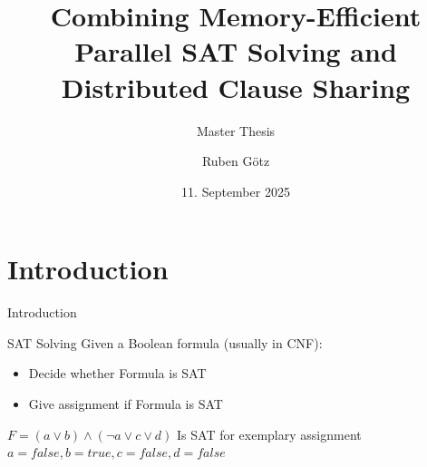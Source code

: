 \documentclass[]{sdqbeamer}
\title{Combining Memory-Efficient Parallel SAT Solving and Distributed Clause Sharing}
\subtitle{Master Thesis}
\author{Ruben Götz}
\date[11.\,9.\,2025]{11. September 2025}
\begin{document}
\begin{frame}[title white vertical, picture=images/palladio_bauplan]
	\titlepage
\end{frame}


\section{Introduction}
\begin{frame}{Introduction}
    \begin{block}{SAT Solving}
        Given a Boolean formula (usually in CNF):
        \begin{itemize}
            \item Decide whether Formula is SAT
            \item Give assignment if Formula is SAT
        \end{itemize}
    \end{block}

    \begin{exampleblock}{$F = (a \lor b) \land (\lnot a \lor c \lor d)$}
        Is SAT for exemplary assignment $a = false, b = true, c = false, d = false$
    \end{exampleblock}
\end{frame}
\end{document}
